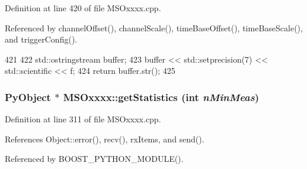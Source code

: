 Definition at line 420 of file MSOxxxx.cpp.

Referenced by channelOffset(), channelScale(), timeBaseOffset(), timeBaseScale(), and triggerConfig().


\begin{DoxyCode}
421 {
422     std::ostringstream buffer;
423     buffer << std::setprecision(7) << std::scientific << f;
424     return buffer.str();
425 }
\end{DoxyCode}
\hypertarget{classMSOxxxx_a38f15b6ad8bc3cdc1836d784b3e96c59}{
\subsubsection[{getStatistics}]{\setlength{\rightskip}{0pt plus 5cm}PyObject $\ast$ MSOxxxx::getStatistics (int {\em nMinMeas})}}
\label{classMSOxxxx_a38f15b6ad8bc3cdc1836d784b3e96c59}


Definition at line 311 of file MSOxxxx.cpp.

References Object::error(), recv(), rxItems, and send().

Referenced by BOOST\_\-PYTHON\_\-MODULE().


